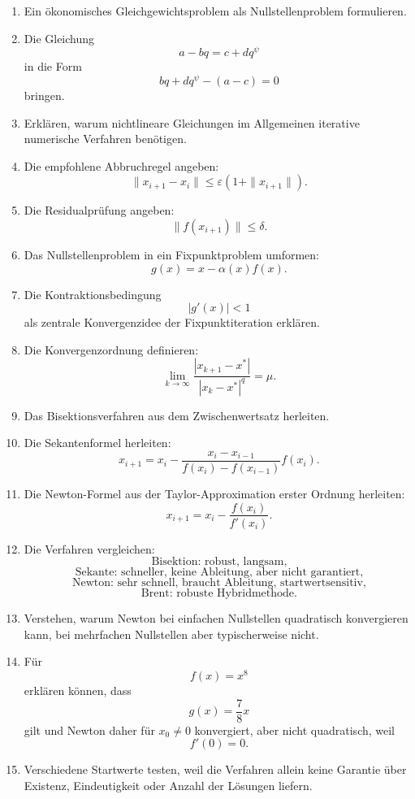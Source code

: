 \documentclass[10pt, letterpaper]{article}
\begin{document}
\begin{enumerate}
    \item Ein ökonomisches Gleichgewichtsproblem als Nullstellenproblem formulieren.

    \item Die Gleichung
    \[
    a-bq=c+dq^\psi
    \]
    in die Form
    \[
    bq+dq^\psi-(a-c)=0
    \]
    bringen.

    \item Erklären, warum nichtlineare Gleichungen im Allgemeinen iterative numerische Verfahren benötigen.

    \item Die empfohlene Abbruchregel angeben:
    \[
    \|x_{i+1}-x_i\|
    \leq
    \varepsilon(1+\|x_{i+1}\|).
    \]

    \item Die Residualprüfung angeben:
    \[
    \|f(x_{i+1})\|\leq \delta.
    \]

    \item Das Nullstellenproblem in ein Fixpunktproblem umformen:
    \[
    g(x)=x-\alpha(x)f(x).
    \]

    \item Die Kontraktionsbedingung
    \[
    |g'(x)|<1
    \]
    als zentrale Konvergenzidee der Fixpunktiteration erklären.

    \item Die Konvergenzordnung definieren:
    \[
    \lim_{k\to\infty}
    \frac{|x_{k+1}-x^\ast|}
    {|x_k-x^\ast|^q}
    =
    \mu.
    \]

    \item Das Bisektionsverfahren aus dem Zwischenwertsatz herleiten.

    \item Die Sekantenformel herleiten:
    \[
    x_{i+1}
    =
    x_i
    -
    \frac{x_i-x_{i-1}}
    {f(x_i)-f(x_{i-1})}
    f(x_i).
    \]

    \item Die Newton-Formel aus der Taylor-Approximation erster Ordnung herleiten:
    \[
    x_{i+1}=x_i-\frac{f(x_i)}{f'(x_i)}.
    \]

    \item Die Verfahren vergleichen:
    \[
    \text{Bisektion: robust, langsam,}
    \]
    \[
    \text{Sekante: schneller, keine Ableitung, aber nicht garantiert,}
    \]
    \[
    \text{Newton: sehr schnell, braucht Ableitung, startwertsensitiv,}
    \]
    \[
    \text{Brent: robuste Hybridmethode.}
    \]

    \item Verstehen, warum Newton bei einfachen Nullstellen quadratisch konvergieren kann, bei mehrfachen Nullstellen aber typischerweise nicht.

    \item Für
    \[
    f(x)=x^8
    \]
    erklären können, dass
    \[
    g(x)=\frac78x
    \]
    gilt und Newton daher für \(x_0\neq 0\) konvergiert, aber nicht quadratisch, weil
    \[
    f'(0)=0.
    \]

    \item Verschiedene Startwerte testen, weil die Verfahren allein keine Garantie über Existenz, Eindeutigkeit oder Anzahl der Lösungen liefern.
\end{enumerate}



\pagebreak
\printbibliography
\end{document}

